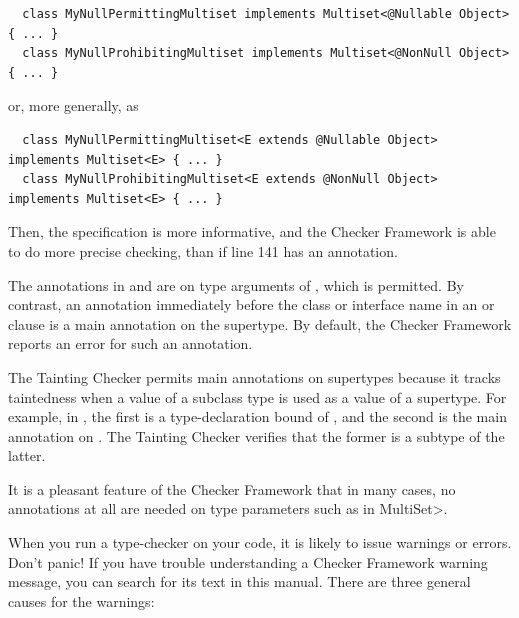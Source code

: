 \begin{Verbatim}
  class MyNullPermittingMultiset implements Multiset<@Nullable Object> { ... }
  class MyNullProhibitingMultiset implements Multiset<@NonNull Object> { ... }
\end{Verbatim}

\noindent
or, more generally, as

\begin{Verbatim}
  class MyNullPermittingMultiset<E extends @Nullable Object> implements Multiset<E> { ... }
  class MyNullProhibitingMultiset<E extends @NonNull Object> implements Multiset<E> { ... }
\end{Verbatim}

Then, the specification is more informative, and the Checker Framework is
able to do more precise checking, than if line 141 has an annotation.

\noindent
The annotations in  and
 are on type arguments of ,
which is permitted.  By contrast, an annotation immediately before the class
or interface name in an  or  clause is a main annotation
on the supertype.  By default, the Checker Framework reports an
 error for such an annotation.

The Tainting Checker permits main annotations on supertypes because it
tracks taintedness when a value of a subclass type is used as a value of a
supertype.  For example, in
,
the first  is a type-declaration bound of
, and the second is the main annotation on
.  The Tainting Checker verifies that the former is a subtype of
the latter.

It is a pleasant feature of the Checker Framework that in many cases, no
annotations at all are needed on type parameters such as  in \<MultiSet>.



When you run a type-checker on your code, it is likely to issue warnings or
errors.  Don't panic!
If you have trouble understanding a Checker Framework warning message, you
can search for its text in this manual.
There are three general causes for the warnings:

